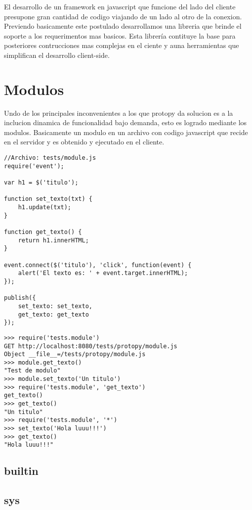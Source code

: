 El desarrollo de un framework en javascript que funcione del lado del cliente presupone gran cantidad de codigo
viajando de un lado al otro de la conexion. Previendo basicamente este postulado desarrollamos una libreria
que brinde el soporte a los requerimentos mas basicos.
Esta librería contituye la base para posteriores contrucciones mas complejas en el ciente y auna herramientas
que simplifican el desarrollo client-side.

\section{Modulos}
Undo de los principales inconvenientes a los que protopy da solucion es a la inclucion dinamica de funcionalidad bajo demanda,
esto es logrado mediante los modulos.
Basicamente un modulo en un archivo con codigo javascript que recide en el servidor y es obtenido y ejecutado en el cliente.

\begin{lstlisting}[style=javascript,label=estructura-modulo,caption=Estructura de un modulo]
//Archivo: tests/module.js
require('event');

var h1 = $('titulo');

function set_texto(txt) {
    h1.update(txt);
}

function get_texto() {
    return h1.innerHTML;
}

event.connect($('titulo'), 'click', function(event) {
    alert('El texto es: ' + event.target.innerHTML);
});

publish({
    set_texto: set_texto,
    get_texto: get_texto
});
\end{lstlisting}

\begin{lstlisting}[style=consola,label=estructura-modulo-test,caption=Test]
>>> require('tests.module')
GET http://localhost:8080/tests/protopy/module.js
Object __file__=/tests/protopy/module.js
>>> module.get_texto()
"Test de modulo"
>>> module.set_texto('Un titulo')
>>> require('tests.module', 'get_texto')
get_texto()
>>> get_texto()
"Un titulo"
>>> require('tests.module', '*')
>>> set_texto('Hola luuu!!!')
>>> get_texto()
"Hola luuu!!!"
\end{lstlisting}

\subsection{builtin}
\subsection{sys}
